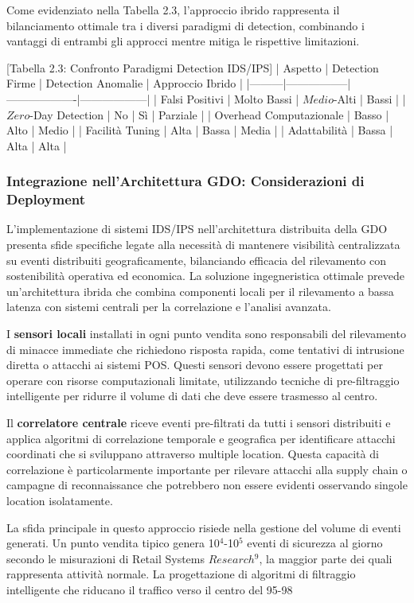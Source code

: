 {Come evidenziato nella Tabella 2.3, l'approccio ibrido rappresenta il bilanciamento ottimale tra i diversi paradigmi di detection, combinando i vantaggi di entrambi gli approcci mentre mitiga le rispettive limitazioni.

[Tabella 2.3: Confronto Paradigmi Detection IDS/IPS]
| Aspetto | Detection Firme | Detection Anomalie | Approccio Ibrido |
|---------|-----------------|-------------------|------------------|
| Falsi Positivi | Molto Bassi | $Medio$-Alti | Bassi |
| $Zero$-Day Detection | No | Sì | Parziale |
| Overhead Computazionale | Basso | Alto | Medio |
| Facilità Tuning | Alta | Bassa | Media |
| Adattabilità | Bassa | Alta | Alta |

\subsubsection{Integrazione nell'Architettura GDO: Considerazioni di Deployment}

L'implementazione di sistemi IDS/IPS nell'architettura distribuita della GDO presenta sfide specifiche legate alla necessità di mantenere visibilità centralizzata su eventi distribuiti geograficamente, bilanciando efficacia del rilevamento con sostenibilità operativa ed economica. La soluzione ingegneristica ottimale prevede un'architettura ibrida che combina componenti locali per il rilevamento a bassa latenza con sistemi centrali per la correlazione e l'analisi avanzata.

I \textbf{sensori locali} installati in ogni punto vendita sono responsabili del rilevamento di minacce immediate che richiedono risposta rapida, come tentativi di intrusione diretta o attacchi ai sistemi POS. Questi sensori devono essere progettati per operare con risorse computazionali limitate, utilizzando tecniche di pre-filtraggio intelligente per ridurre il volume di dati che deve essere trasmesso al centro.

Il \textbf{correlatore centrale} riceve eventi pre-filtrati da tutti i sensori distribuiti e applica algoritmi di correlazione temporale e geografica per identificare attacchi coordinati che si sviluppano attraverso multiple location. Questa capacità di correlazione è particolarmente importante per rilevare attacchi alla supply chain o campagne di reconnaissance che potrebbero non essere evidenti osservando singole location isolatamente.

La sfida principale in questo approccio risiede nella gestione del volume di eventi generati. Un punto vendita tipico genera 10$^{4}$-10$^{5}$ eventi di sicurezza al giorno secondo le misurazioni di Retail Systems $Research$$^{9}$, la maggior parte dei quali rappresenta attività normale. La progettazione di algoritmi di filtraggio intelligente che riducano il traffico verso il centro del 95-98%

}
